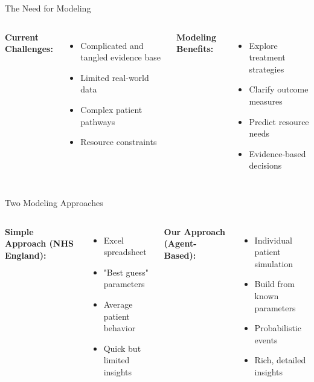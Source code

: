 \documentclass[10pt,aspectratio=169]{beamer}
\begin{document}
\begin{frame}{The Need for Modeling}
\begin{columns}[T]
\textbf{Current Challenges:}
\begin{itemize}
    \item Complicated and tangled evidence base
    \item Limited real-world data
    \item Complex patient pathways
    \item Resource constraints
\end{itemize}

\textbf{Modeling Benefits:}
\begin{itemize}
    \item Explore treatment strategies
    \item Clarify outcome measures
    \item Predict resource needs
    \item Evidence-based decisions
\end{itemize}
\end{columns}
\end{frame}

\begin{frame}{Two Modeling Approaches}
\begin{columns}[T]
\textbf{Simple Approach (NHS England):}
\begin{itemize}
    \item Excel spreadsheet
    \item "Best guess" parameters
    \item Average patient behavior
    \item Quick but limited insights
\end{itemize}

\textbf{Our Approach (Agent-Based):}
\begin{itemize}
    \item Individual patient simulation
    \item Build from known parameters
    \item Probabilistic events
    \item Rich, detailed insights
\end{itemize}
\end{columns}

\vspace{0.5cm}
\centering
{}
\end{frame}
\end{document}
